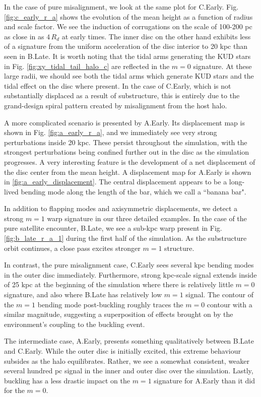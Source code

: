 In the case of pure misalignment, we look at the same plot for C.Early. Fig. \ref{fig:c_early_r_a} shows the evolution of the mean height as a function of radius and scale factor. We see the induction of corrugations on the scale of 100-200 pc as close in as $4\,R_d$ at early times. The inner disc on the other hand exhibits less of a signature from the uniform acceleration of the disc interior to 20 kpc than seen in B.Late. It is worth noting that the tidal arms generating the KUD stars in Fig. \ref{fig:xy_tidal_tail_halo_c} are reflected in the $m=0$ signature. At these large radii, we should see both the tidal arms which generate KUD stars and the tidal effect on the disc where present. In the case of C.Early, which is not substantially displaced as a result of substructure, this is entirely due to the grand-design spiral pattern created by misalignment from the host halo.

A more complicated scenario is presented by A.Early. Its displacement map is shown in Fig. \ref{fig:a_early_r_a}, and we immediately see very strong perturbations inside 20 kpc. These persist throughout the simulation, with the strongest perturbations being confined further out in the disc as the simulation progresses. A very interesting feature is the development of a net displacement of the disc center from the mean height. A displacement map for A.Early is shown in \ref{fig:a_early_displacement}. The central displacement appears to be a long-lived bending mode along the length of the bar, which we call a ``banana bar". 


In addition to flapping modes and axisymmetric displacements, we detect a strong $m=1$ warp signature in our three detailed examples. In the case of the pure satellite encounter, B.Late, we see a sub-kpc warp present in Fig. \ref{fig:b_late_r_a_1} during the first half of the simulation. As the substructure orbit continues, a close pass excites stronger $m=1$ structure. 

In contrast, the pure misalignment case, C.Early sees several kpc bending modes in the outer disc immediately. Furthermore, strong kpc-scale signal extends inside of 25 kpc at the beginning of the simulation where there is relatively little $m=0$ signature, and also where B.Late has relatively low $m=1$ signal. The contour of the $m=1$ bending mode post-buckling roughly traces the $m=0$ contour with a similar magnitude, suggesting a superposition of effects brought on by the environment's coupling to the buckling event.

The intermediate case, A.Early, presents something qualitatively between B.Late and C.Early. While the outer disc is initially excited, this extreme behaviour subsides as the halo equilibrates. Rather, we see a somewhat consistent, weaker several hundred pc signal in the inner and outer disc over the simulation. Lastly, buckling has a less drastic impact on the $m=1$ signature for A.Early than it did for the $m=0$.



